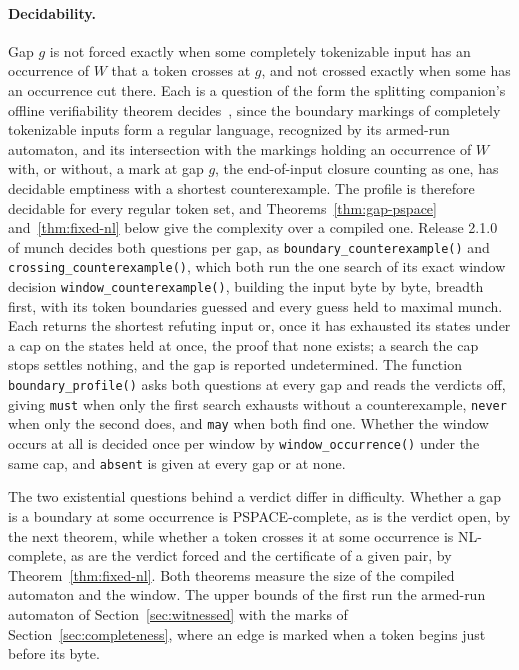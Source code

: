 \documentclass[11pt,a4paper]{article}
\theoremstyle{definition}
\theoremstyle{plain}
\newcommand{\code}[1]{\texttt{#1}}
\begin{document}
\paragraph{Decidability.} Gap $g$ is not forced exactly when some completely tokenizable input has an occurrence of $W$
that a token crosses at $g$, and not crossed exactly when some has an occurrence cut there. Each is a question of the
form the splitting companion's offline verifiability theorem decides~\cite{nidhogg2026splitting}, since the boundary
markings of completely tokenizable inputs form a regular language, recognized by its armed-run automaton, and its
intersection with the markings holding an occurrence of $W$ with, or without, a mark at gap $g$, the end-of-input
closure counting as one, has decidable emptiness with a shortest counterexample. The profile is therefore decidable for
every regular token set, and Theorems~\ref{thm:gap-pspace} and~\ref{thm:fixed-nl} below give the complexity over a
compiled one. Release 2.1.0 of munch decides both questions per gap, as \code{boundary\_counterexample()} and
\code{crossing\_counterexample()}, which both run the one search of its exact window decision
\code{window\_counterexample()}, building the input byte by byte, breadth first, with its token boundaries guessed and
every guess held to maximal munch. Each returns the shortest refuting input or, once it has exhausted its states under a
cap on the states held at once, the proof that none exists; a search the cap stops settles nothing, and the gap is
reported undetermined. The function \code{boundary\_profile()} asks both questions at every gap and reads the verdicts
off, giving \code{must} when only the first search exhausts without a counterexample, \code{never} when only the second
does, and \code{may} when both find one. Whether the window occurs at all is decided once per window by
\code{window\_occurrence()} under the same cap, and \code{absent} is given at every gap or at none.

The two existential questions behind a verdict differ in difficulty. Whether a gap is a boundary at some occurrence is
PSPACE-complete, as is the verdict open, by the next theorem, while whether a token crosses it at some occurrence is
NL-complete, as are the verdict forced and the certificate of a given pair, by Theorem~\ref{thm:fixed-nl}. Both theorems
measure the size of the compiled automaton and the window. The upper bounds of the first run the armed-run automaton of
Section~\ref{sec:witnessed} with the marks of Section~\ref{sec:completeness}, where an edge is marked when a token
begins just before its byte.
\end{document}
